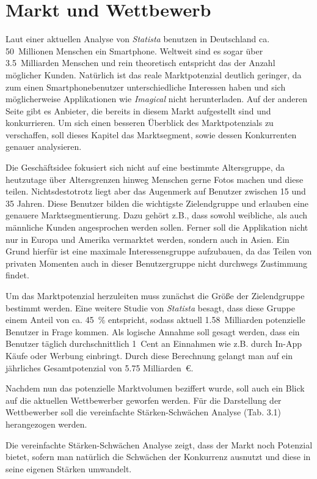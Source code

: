 \chapter{Markt und Wettbewerb}
Laut einer aktuellen Analyse von \textit{Statista} benutzen in Deutschland ca. 50~Millionen Menschen ein Smartphone. Weltweit sind es sogar über 3.5~Milliarden Menschen und rein theoretisch entspricht das der Anzahl möglicher Kunden. Natürlich ist das reale Marktpotenzial deutlich geringer, da zum einen Smartphonebenutzer unterschiedliche Interessen haben und sich möglicherweise Applikationen wie \textit{Imagical} nicht herunterladen. Auf der anderen Seite gibt es Anbieter, die bereits in diesem Markt aufgestellt sind und konkurrieren. Um sich einen besseren Überblick des Marktpotenzials zu verschaffen, soll dieses Kapitel das Marktsegment, sowie dessen Konkurrenten genauer analysieren.

Die Geschäftsidee fokusiert sich nicht auf eine bestimmte Altersgruppe, da heutzutage über Altersgrenzen hinweg Menschen gerne Fotos machen und diese teilen. Nichtsdestotrotz liegt aber das Augenmerk auf Benutzer zwischen 15 und 35 Jahren. Diese Benutzer bilden die wichtigste Zielendgruppe und erlauben eine genauere Marktsegmentierung. Dazu gehört z.B., dass sowohl weibliche, als auch männliche Kunden angesprochen werden sollen. Ferner soll die Applikation nicht nur in Europa und Amerika vermarktet werden, sondern auch in Asien. Ein Grund hierfür ist eine maximale Interessensgruppe aufzubauen, da das Teilen von privaten Momenten auch in dieser Benutzergruppe nicht durchwegs Zustimmung findet.

Um das Marktpotenzial herzuleiten muss zunächst die Größe der Zielendgruppe bestimmt werden. Eine weitere Studie von \textit{Statista} besagt, dass diese Gruppe einem Anteil von ca. 45~\% entspricht, sodass aktuell 1.58~Milliarden potenzielle Benutzer in Frage kommen. Als logische Annahme soll gesagt werden, dass ein Benutzer täglich durchschnittlich 1~Cent an Einnahmen wie z.B. durch In-App Käufe oder Werbung einbringt. Durch diese Berechnung gelangt man auf ein jährliches Gesamtpotenzial von 5.75 Milliarden~€.

Nachdem nun das potenzielle Marktvolumen beziffert wurde, soll auch ein Blick auf die aktuellen Wettbewerber geworfen werden. Für die Darstellung der Wettbewerber soll die vereinfachte Stärken-Schwächen Analyse (Tab. 3.1) herangezogen werden.

Die vereinfachte Stärken-Schwächen Analyse zeigt, dass der Markt noch Potenzial bietet, sofern man natürlich die Schwächen der Konkurrenz ausnutzt und diese in seine eigenen Stärken umwandelt.

